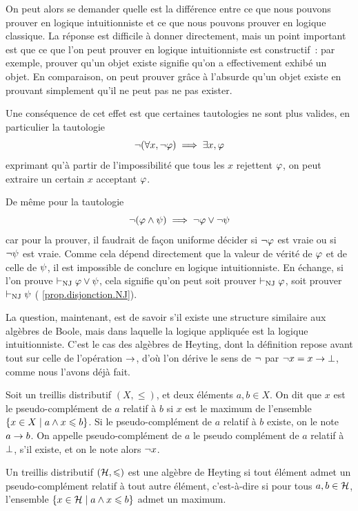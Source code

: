 On peut alors se demander quelle est la différence entre ce que nous pouvons
prouver en logique intuitionniste et ce que nous pouvons prouver en logique
classique. La réponse est difficile à donner directement, mais un point
important est que ce que l'on peut prouver en logique intuitionniste est
constructif~: par exemple, prouver qu'un objet existe signifie qu'on a
effectivement exhibé un objet. En comparaison, on peut prouver grâce à l'absurde
qu'un objet existe en prouvant simplement qu'il ne peut pas ne pas exister.

Une conséquence de cet effet est que certaines tautologies ne sont plus valides,
en particulier la tautologie
\[\lnot(\forall x, \lnot \varphi) \implies \exists x, \varphi\]
exprimant qu'à partir de l'impossibilité que tous les $x$ rejettent $\varphi$,
on peut extraire un certain $x$ acceptant $\varphi$.

De même pour la tautologie
\[\lnot (\varphi \land \psi) \implies \lnot \varphi \lor \lnot \psi\]
car pour la prouver, il faudrait de façon uniforme décider si $\lnot \varphi$ est
vraie ou si $\lnot \psi$ est vraie. Comme cela dépend directement que la
valeur de vérité de $\varphi$ et de celle de $\psi$, il est impossible de
conclure en logique intuitionniste. En échange, si l'on prouve
$\vdash_{\operatorname{NJ}} \varphi \lor \psi$, cela signifie qu'on
peut soit prouver $\vdash_{\operatorname{NJ}} \varphi$, soit prouver $\vdash_{\operatorname{NJ}} \psi$
( \cref{prop.disjonction.NJ}).

La question, maintenant, est de savoir s'il existe une structure similaire aux
algèbres de Boole, mais dans laquelle la logique appliquée est la logique
intuitionniste. C'est le cas des algèbres de Heyting, dont la définition repose
avant tout sur celle de l'opération $\to$, d'où l'on dérive le sens de
$\lnot$ par $\lnot x = x \to \bot$, comme nous l'avons déjà fait.

\begin{definition}
  Soit un treillis distributif $(X,\leq)$, et deux éléments $a,b\in X$. On dit
  que $x$ est le pseudo-complément de $a$ relatif à $b$ si $x$ est le
  maximum de l'ensemble $\left\{ x \in X \;\middle\vert\; a \wedge x \leqslant b \right\}$. Si le
  pseudo-complément de $a$ relatif à $b$ existe, on le note $a\to b$.
  On appelle pseudo-complément de $a$ le pseudo complément de $a$ relatif à
  $\bot$, s'il existe, et on le note alors $\lnot x$.
\end{definition}

\begin{definition}
  Un treillis distributif $(\mathcal{H},\leqslant)$ est une algèbre de Heyting si
  tout élément admet un pseudo-complément relatif à tout autre élément,
  c'est-à-dire si pour tous $a,b\in \mathcal{H}$, l'ensemble
  $\left\{ x\in \mathcal{H} \;\middle\vert\; a \wedge x \leqslant b \right\}$ admet un
  maximum.
\end{definition}

